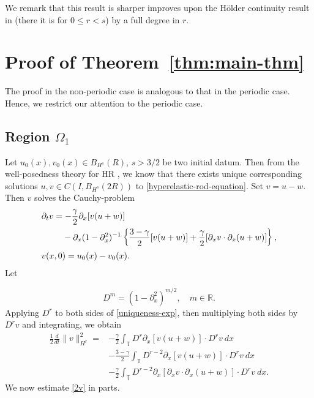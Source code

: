 \documentclass[12pt,reqno]{amsart}
\numberwithin{equation}{section}  %
\numberwithin{figure}{section}
\newcommand{\rr}{\mathbb{R}}
\newcommand{\ci}{\mathbb{T}}
\newcommand{\p}{\partial}
\begin{document}
%
%
%
%
%
%
%
We remark that this result is sharper improves upon the H\"older continuity result in
\cite{Chen:2011fk} (there it is for $0 \le r < s$) by a full degree in $r$. 
%
%
%
%
\section{Proof of Theorem~\ref{thm:main-thm}}
%
%
The proof in the non-periodic case is analogous to that in the periodic case.
Hence, we restrict our attention to the periodic case. 
%
%
%
\subsection{Region $\Omega_{1}$} 
\label{ssec:reg-m-imp}
%
%
Let $u_{0}(x), v_{0}(x)
\in B_{H^{s}}(R)$, $s > 3/2$ be two initial datum. Then from
the well-posedness theory for HR \cite{Karapetyan:2010fk}, we
know that there exists unique corresponding solutions $u, v \in C(I,
B_{H^{s}}(2R))$ to \eqref{hyperelastic-rod-equation}.
Set $v=u-w$. Then $v$ solves the Cauchy-problem
%
%
\begin{align}
	\label{uniqueness-exp}
& \p_t v
=  -\frac{\gamma}{2} \p_x [v(u + w)] 
\\
\notag
& \phantom{\p_t v = }-\p_x (1 - \p_{x}^{2})^{-1} \left\{
\frac{3-\gamma}{2}[v(u+w)] + \frac{\gamma}{2}[\p_x v \cdot \p_x (u+w)]
\right\},
\\
& v(x,0) = u_{0}(x) - v_{0}(x).
\label{uniqueness-init-data}
\end{align}
%
%
%
Let

\begin{equation*}
	D^{m} = (1 - \p_x^2)^{m/2}, \quad m \in \rr.
\end{equation*}
%
Applying $D^r$ to both sides of \eqref{uniqueness-exp}, then 
multiplying both sides by $D^r v$ and integrating, we obtain
%
%
\begin{equation}
\begin{split}
 \frac{1}{2} \frac{d}{dt} \|v\|_{H^r}^2
 = & -\frac{\gamma}{2} \int_{\ci} D^r \p_x [v(u+w)] \cdot
D^r v \ dx
\\
& - \frac{3-\gamma}{2} \int_{\ci}  D^{r -2}
\p_x[v(u+w)] \cdot
D^r v \ dx  
\\
& - \frac{\gamma}{2} \int_{\ci} D^{r 
-2} \p_x [ \p_x v
\cdot \p_x (u+w)]\cdot D^r v \ dx.
\label{2v}
\end{split}
\end{equation}
%
%
We now estimate \eqref{2v} in parts.
\end{document}
